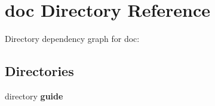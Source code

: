 \section{doc Directory Reference}
\label{dir_822a62d130d1912db2773e26ec755631}
Directory dependency graph for doc\-:
\subsection*{Directories}
\begin{DoxyCompactItemize}
\item 
directory {\bf guide}
\end{DoxyCompactItemize}

